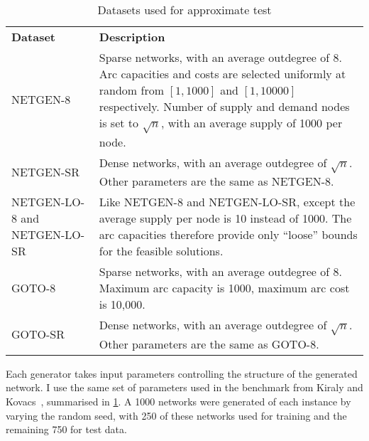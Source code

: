 \begin{table}
    \centering
    \setlength{\tabcolsep}{1.5em}
    \begin{tabular}{p{}p{}}
        \textbf{Dataset} & \textbf{Description} \tabularnewline
        NETGEN-8 & Sparse networks, with an average outdegree of $8$. Arc capacities and costs are selected uniformly at random from $\left[1,1000\right]$ and $\left[1,10000\right]$ respectively. Number of supply and demand nodes is set to $\sqrt{n}$, with an average supply of 1000 per node. \tabularnewline
        NETGEN-SR & Dense networks, with an average outdegree of $\sqrt{n}$. Other parameters are the same as NETGEN-8. \tabularnewline
        NETGEN-LO-8 and NETGEN-LO-SR & Like NETGEN-8 and NETGEN-LO-SR, except the average supply per node is 10 instead of 1000. The arc capacities therefore provide only ``loose'' bounds for the feasible solutions. \tabularnewline
        GOTO-8 & Sparse networks, with an average outdegree of $8$. Maximum arc capacity is 1000, maximum arc cost is 10,000. \tabularnewline
        GOTO-SR & Dense networks, with an average outdegree of $\sqrt{n}$. Other parameters are the same as GOTO-8. \tabularnewline
    \end{tabular}
    \caption{Datasets used for approximate test}
    \label{table:general-datasets}
\end{table}

Each generator takes input parameters controlling the structure of the generated network. I use the same set of parameters used in the benchmark from Kiraly and Kovacs~\cite{KiralyKovacs:2012}, summarised in \cref{table:general-datasets}. A 1000 networks were generated of each instance by varying the random seed, with 250 of these networks used for training and the remaining 750 for test data.

